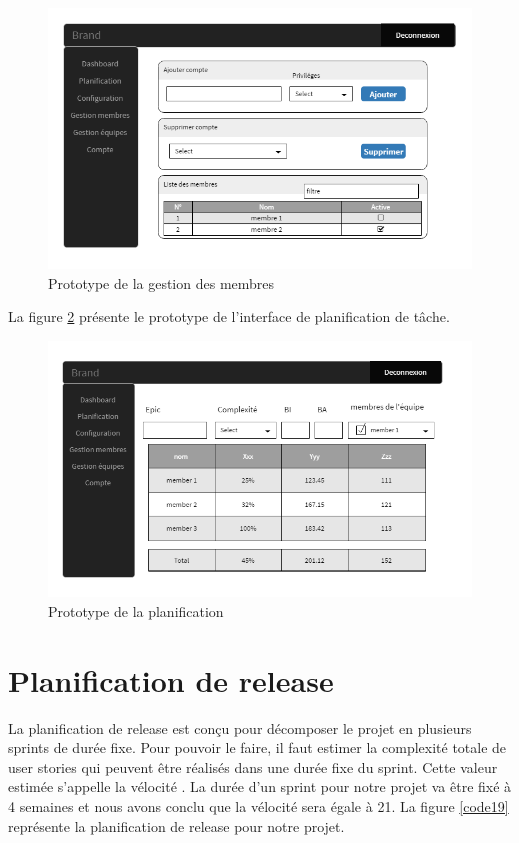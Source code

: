 \begin{figure}[H]
  \centering
  \includegraphics[scale=0.74]{figures/prototypes/Gestion_membres.PNG}
  \caption{Prototype de la gestion des membres}
  \label{code17}
\end{figure}
La figure \ref{code18} présente le prototype de l'interface de planification de tâche.
\begin{figure}[H]
  \centering
  \includegraphics[scale=0.74]{figures/prototypes/Planification.PNG}
  \caption{Prototype de la planification}
  \label{code18}
\end{figure}

\section{Planification de release}
La planification de release est conçu pour décomposer le projet en plusieurs sprints de durée fixe. Pour pouvoir le faire, il faut estimer la complexité totale de user stories qui peuvent être réalisés dans une durée fixe du sprint. Cette valeur estimée s'appelle la vélocité \cite{Planning_sprint} \cite{Estimation_planification_Agile}. La durée d'un sprint pour notre projet va être fixé à 4 semaines et nous avons conclu que la vélocité sera égale à 21. La figure \ref{code19} représente la planification de release pour notre projet.

